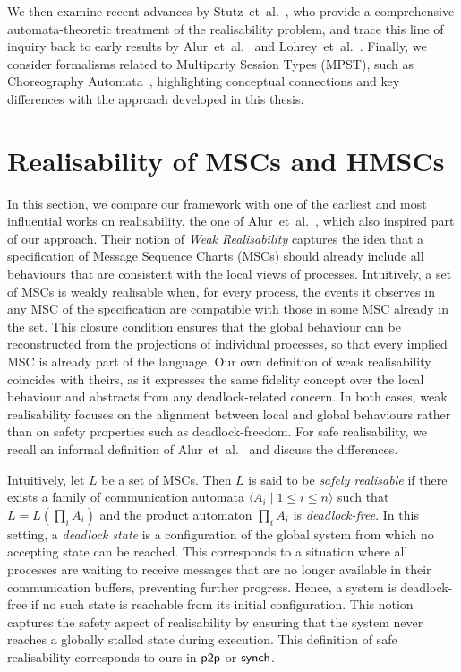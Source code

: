We then examine recent advances by
Stutz~et~al.~\cite{stutz2024implementability}, who provide a
comprehensive automata-theoretic treatment of the realisability problem,
and trace this line of inquiry back to early results by
Alur~et~al.~\cite{alur2000inference} and
Lohrey~et~al.~\cite{lohrey2003realizability}.  
Finally, we consider formalisms related to Multiparty Session Types
(MPST), such as Choreography Automata~\cite{barbanera2020choreography},
highlighting conceptual connections and key differences with the
approach developed in this thesis.

\section{Realisability of MSCs and HMSCs}
In this section, we compare our framework with one of the earliest and
most influential works on realisability, the one of 
Alur~et~al.~\cite{alur2005realizability}, which also inspired part of our
approach. Their notion of \emph{Weak Realisability} captures the idea that
a specification of Message Sequence Charts (MSCs) should already include
all behaviours that are consistent with the local views of processes. 
Intuitively, a set of MSCs is weakly realisable when, for every process,
the events it observes in any MSC of the specification are compatible
with those in some MSC already in the set. This closure condition ensures
that the global behaviour can be reconstructed from the projections of
individual processes, so that every implied MSC is already part of the
language. 
Our own definition
of weak realisability coincides with theirs, as it expresses the same
fidelity concept over the local behaviour and abstracts from any
deadlock-related concern. In both cases, weak realisability focuses on
the alignment between local and global behaviours rather than on safety
properties such as deadlock-freedom. For safe realisability, we recall an
informal definition of Alur~et~al.~\cite{alur2005realizability} and discuss
the differences.

Intuitively, let $L$ be a set of MSCs. Then $L$ is said to be 
\emph{safely realisable} if there exists a family of communication automata 
$\langle A_i \mid 1 \leq i \leq n \rangle$ such that $L = L(\prod_i A_i)$ 
and the product automaton $\prod_i A_i$ is \emph{deadlock-free}. 
In this setting, a \emph{deadlock state} is a configuration of the global 
system from which no accepting state can be reached. 
This corresponds to a situation where all processes are 
waiting to receive messages that are no longer available in their 
communication buffers, preventing further progress. 
Hence, a system is deadlock-free if no such state is reachable from its 
initial configuration. This notion captures the safety aspect of 
realisability by ensuring that the system never reaches a globally 
stalled state during execution. This definition of safe realisability 
corresponds to ours in $\mathsf{p2p}$ or $\mathsf{synch}$.


